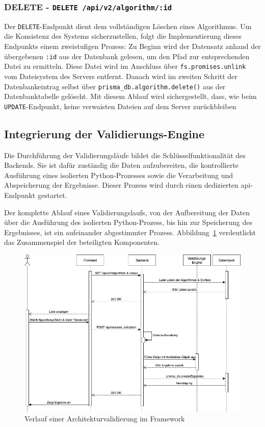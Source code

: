 \subsubsection*{DELETE - \texttt{DELETE /api/v2/algorithm/:id}}

Der \texttt{DELETE}-Endpunkt dient dem vollständigen Löschen eines Algorithmus. Um die Konsistenz des Systems sicherzustellen, folgt die Implementierung dieses Endpunkts einem zweistufigen Prozess: Zu Beginn wird der Datensatz anhand der übergebenen \texttt{:id} aus der Datenbank gelesen, um den Pfad zur entsprechenden Datei zu ermitteln. Diese Datei wird im Anschluss über \texttt{fs.promises.unlink} vom Dateisystem des Servers entfernt. Danach wird im zweiten Schritt der Datenbankeintrag selbst über \texttt{prisma\_db.algorithm.delete()} aus der Datenbanktabelle gelöscht. Mit diesem Ablauf wird sichergestellt, dass, wie beim \texttt{UPDATE}-Endpunkt, keine verwaisten Dateien auf dem Server zurückbleiben

\subsection{Integrierung der Validierungs-Engine}
\label{subsec:engine}

Die Durchführung der Validierungsläufe bildet die Schlüsselfunktionalität des Backends. Sie ist dafür zuständig die Daten aufzubereiten, die kontrollierte Ausführung eines isolierten Python-Prozesses sowie die Verarbeitung und Abspeicherung der Ergebnisse. Dieser Prozess wird durch einen dedizierten \gls{api}-Endpunkt gestartet.

Der komplette Ablauf eines Validierungslaufs, von der Aufbereitung der Daten über die Ausführung des isolierten Python-Prozess, bis hin zur Speicherung des Ergebnisses, ist ein aufeinander abgestimmter Prozess. Abbildung~\ref{fig:seqvalid} verdeutlicht das Zusammenspiel der beteiligten Komponenten.

\begin{figure}[h!]
  \centering
  \includegraphics[width=\textwidth]{figures/05Implementierung/Sequenz_valid.drawio.png}
  \caption{Verlauf einer Architekturvalidierung im Framework}
  \label{fig:seqvalid}
\end{figure}

